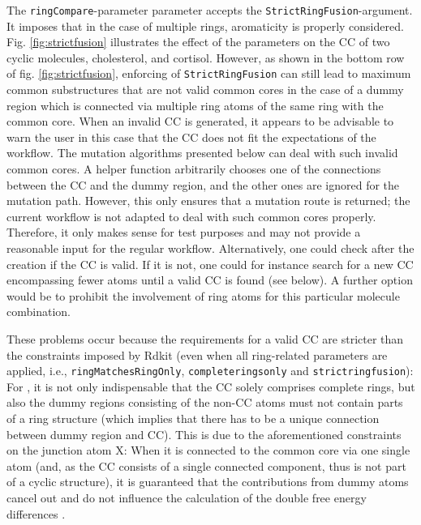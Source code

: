 The \texttt{ringCompare}-parameter parameter accepts the \texttt{StrictRingFusion}-argument.
It imposes that in the case of multiple rings, aromaticity is properly
considered. Fig. \ref{fig:strictfusion} illustrates the effect of the parameters
on the CC of two cyclic molecules, cholesterol, and cortisol. However, as shown in the bottom row of fig. \ref{fig:strictfusion}, enforcing
of \texttt{StrictRingFusion} can still lead to maximum common substructures
that are not valid {\trafo} common cores in the case of a dummy region
which is connected via multiple ring atoms of the same ring with the common
core. 
When an invalid CC is generated, it appears to be advisable to warn the user in this case that the CC does not fit the expectations of the {\trafo} workflow. 
The mutation algorithms presented below can deal with such invalid common cores. A helper function arbitrarily chooses one of the connections between the CC and the dummy region, and the other ones are ignored for the mutation path. However, this only ensures that a mutation route is returned; the current {\trafo} workflow is not adapted to deal with such common cores properly. Therefore, it only makes sense for test purposes and may not provide a reasonable input for the regular workflow.
Alternatively, one could check after the creation if the CC is valid. If
it is not, one could for instance search for a new CC encompassing fewer
atoms until a valid CC is found (see below). A further option would be to prohibit the involvement of ring atoms for this particular molecule combination.

These problems occur because the requirements for a valid {\trafo} CC are stricter than the constraints imposed by Rdkit  (even when all ring-related parameters are applied, i.e., \texttt{ringMatchesRingOnly}, \texttt{completeringsonly} and \texttt{strictringfusion}): For {\trafo}, it is not only indispensable that the CC solely comprises complete rings, but also the dummy regions consisting of the non-CC atoms must not contain parts of a ring structure (which implies that there has to be a unique connection between dummy region and CC). This is due to the aforementioned constraints on the junction atom X: When it is connected to the common core via one single atom (and, as the CC consists of a single connected component, thus is not part of a cyclic structure), it is guaranteed that the contributions from dummy atoms cancel out and do not influence the calculation of the double free energy differences \cite{Karwounopoulos.2022}.

